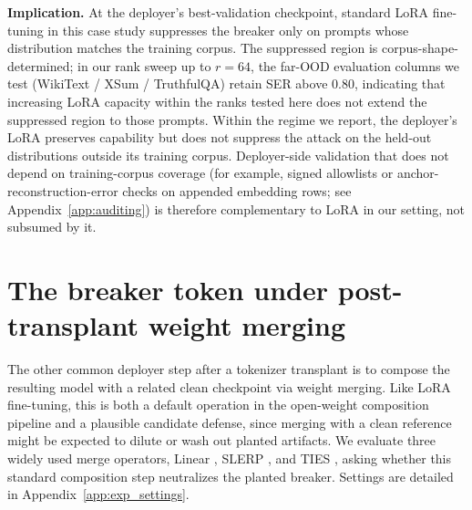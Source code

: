 \documentclass{article}
\theoremstyle{plain}
\theoremstyle{definition}
\theoremstyle{remark}
\begin{document}
\noindent\textbf{Implication.}
At the deployer's best-validation checkpoint, standard LoRA fine-tuning in this case study suppresses the breaker only on prompts whose distribution matches the training corpus. The suppressed region is corpus-shape-determined; in our rank sweep up to $r{=}64$, the far-OOD evaluation columns we test (WikiText / XSum / TruthfulQA) retain SER above $0.80$, indicating that increasing LoRA capacity within the ranks tested here does not extend the suppressed region to those prompts. Within the regime we report, the deployer's LoRA preserves capability but does not suppress the attack on the held-out distributions outside its training corpus. Deployer-side validation that does not depend on training-corpus coverage (for example, signed allowlists or anchor-reconstruction-error checks on appended embedding rows; see Appendix~\ref{app:auditing}) is therefore complementary to LoRA in our setting, not subsumed by it.

\section{The breaker token under post-transplant weight merging}
\label{app:weight_merging}

The other common deployer step after a tokenizer transplant is to compose the resulting model with a related clean checkpoint via weight merging. Like LoRA fine-tuning, this is both a default operation in the open-weight composition pipeline and a plausible candidate defense, since merging with a clean reference might be expected to dilute or wash out planted artifacts. We evaluate three widely used merge operators, Linear \citep{wortsman2022soups}, SLERP \citep{mergekit2024}, and TIES \citep{yadav2023ties}, asking whether this standard composition step neutralizes the planted breaker. Settings are detailed in Appendix~\ref{app:exp_settings}.
\end{document}
